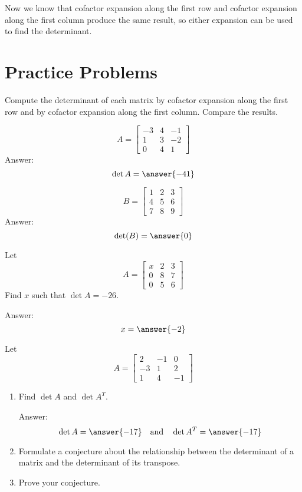 \documentclass{ximera}
\begin{document}
Now we know that cofactor expansion along the first row and cofactor expansion along the first column produce the same result, so either expansion can be used to find the determinant.  

\section*{Practice Problems}

\begin{problem} Compute the determinant of each matrix by cofactor expansion along the first row and by cofactor expansion along the first column.  Compare the results.
\begin{problem}\label{prob:rowcolexpansionequiv1}
$$A=\begin{bmatrix}-3&4&-1\\1&3&-2\\0&4&1\end{bmatrix}$$
Answer:
$$\det{A}=\answer{-41}$$
\end{problem}

\begin{problem}\label{prob:rowcolexpansionequiv2}
$$B=\begin{bmatrix}1&2&3\\4&5&6\\7&8&9\end{bmatrix}$$
Answer:
$$\text{det}(B)=\answer{0}$$
\end{problem}
\end{problem}

\begin{problem}\label{prob:det26} Let 
$$A=\begin{bmatrix}x&2&3\\0&8&7\\0&5&6\end{bmatrix}$$
Find $x$ such that $\det{A}=-26$.

Answer: $$x=\answer{-2}$$
\end{problem}

\begin{problem}\label{prob:dettranspose}
Let $$A=\begin{bmatrix}2&-1&0\\-3&1&2\\1&4&-1\end{bmatrix}$$
\begin{enumerate}
\item
Find $\det{A}$ and $\det{A^T}$.

Answer:
$$\det{A}=\answer{-17}\quad\text{and}\quad\det{A^T}=\answer{-17}$$
\item Formulate a conjecture about the relationship between the determinant of a matrix and the determinant of its transpose.
\item Prove your conjecture.
\end{enumerate}
\end{problem}
\end{document}
